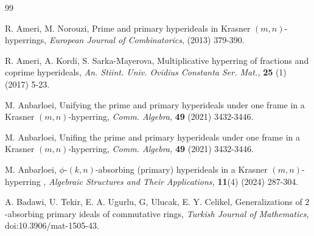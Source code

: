 \documentclass[preprint,review,10pt]{amsart}
\theoremstyle{definition}
\theoremstyle{remark}
\numberwithin{equation}{section}
\begin{document}
\begin{thebibliography}{99}


R. Ameri, M. Norouzi, Prime and primary hyperideals in Krasner $(m,n)$-hyperrings,  {\it European Journal of Combinatorics}, (2013) 379-390.

R. Ameri, A. Kordi, S. Sarka-Mayerova, Multiplicative hyperring of fractions  and coprime hyperideals, {\it An. Stiint. Univ. Ovidius Constanta Ser. Mat.,} {\bf 25} (1) (2017) 5-23. 




M. Anbarloei, Unifying the prime and primary hyperideals under one frame in a Krasner $(m,n)$-hyperring, {\it Comm. Algebra}, {\bf 49} (2021) 3432-3446.



M. Anbarloei, Unifing the prime and primary hyperideals under one frame in a Krasner $(m,n)$-hyperring, {\it Comm. Algebra,} {\bf 49} (2021) 3432-3446.



M. Anbarloei, $\phi$-$(k,n)$-absorbing (primary) hyperideals in a  Krasner $(m, n)$-hyperring , {\it Algebraic Structures and Their Applications,} {\bf 11}(4) (2024) 287-304.



A. Badawi, U. Tekir, E. A. Ugurlu, G, Ulucak, E. Y. Celikel, Generalizations of $2$-absorbing primary ideals of commutative rings, {\it Turkish Journal of Mathematics}, doi:10.3906/mat-1505-43. 



\end{thebibliography}
\end{document}
